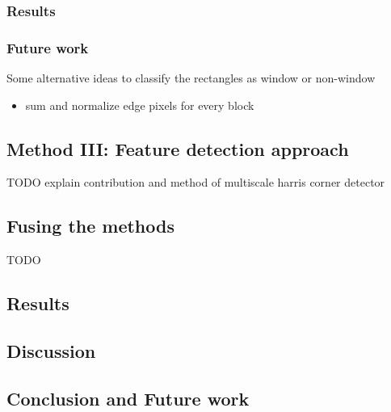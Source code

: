 \subsubsection{Results}

\subsubsection{Future work}
Some alternative ideas to classify the rectangles as window or non-window
\begin{itemize}
	\item sum and normalize edge pixels for every block 
\end{itemize}


\subsection{Method III: Feature detection approach}
	TODO explain contribution and method of multiscale harris corner detector

\subsection{Fusing the methods}
	TODO

\subsection{Results}
\subsection{Discussion}  %
\subsection{Conclusion and Future work}




% 
% 
% 
% 
% 
% 
% 
% 
